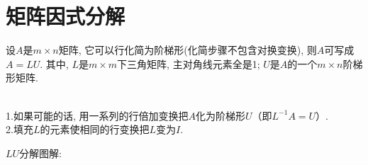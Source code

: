 \section{矩阵因式分解}
设$A$是$m\times n$矩阵, 它可以行化简为阶梯形(化简步骤不包含对换变换), 则$A$可写成$A=LU$. 其中, $L$是$m\times m$下三角矩阵, 主对角线元素全是1; $U$是$A$的一个$m\times n$阶梯形矩阵.\\[2ex]

\begin{law}[$LU$分解的算法]\ \\
1.如果可能的话, 用一系列的行倍加变换把$A$化为阶梯形$U$（即$L^{-1}A=U$）.\\
2.填充$L$的元素使相同的行变换把$L$变为$I$.
\end{law}\vspace{4ex}

$LU$分解图解:\\

